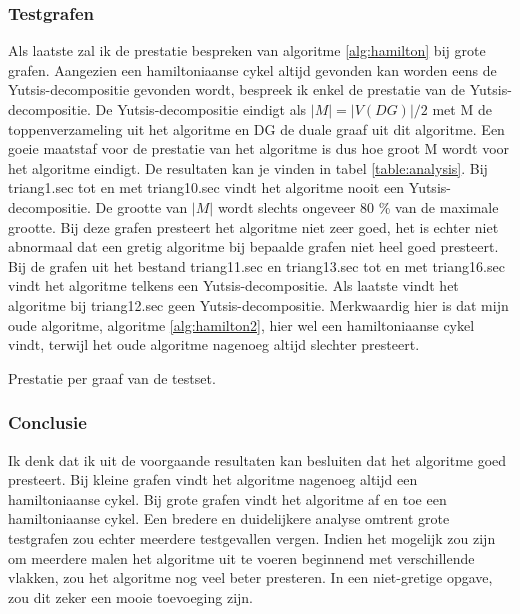 \documentclass[11pt, a4paper, table]{article}
\theoremstyle{definition}
\theoremstyle{definition}
\theoremstyle{definition}
\begin{document}
\subsubsection{Testgrafen}
Als laatste zal ik de prestatie bespreken van algoritme \ref{alg:hamilton} bij grote grafen. Aangezien een hamiltoniaanse cykel altijd gevonden kan worden eens de Yutsis-decompositie gevonden wordt, bespreek ik enkel de prestatie van de Yutsis-decompositie. De Yutsis-decompositie eindigt als $|M| = |V(DG)|/2$ met M de toppenverzameling uit het algoritme en DG de duale graaf uit dit algoritme. Een goeie maatstaf voor de prestatie van het algoritme is dus hoe groot M wordt voor het algoritme eindigt. De resultaten kan je vinden in tabel \ref{table:analysis}. Bij triang1.sec tot en met triang10.sec vindt het algoritme nooit een Yutsis-decompositie. De grootte van $|M|$ wordt slechts ongeveer 80 \% van de maximale grootte. Bij deze grafen presteert het algoritme niet zeer goed, het is echter niet abnormaal dat een gretig algoritme bij bepaalde grafen niet heel goed presteert. Bij de grafen uit het bestand triang11.sec en triang13.sec tot en met triang16.sec vindt het algoritme telkens een Yutsis-decompositie. Als laatste vindt het algoritme bij triang12.sec geen Yutsis-decompositie. Merkwaardig hier is dat mijn oude algoritme, algoritme \ref{alg:hamilton2}, hier wel een hamiltoniaanse cykel vindt, terwijl het oude algoritme nagenoeg altijd slechter presteert. 
\begin{table}
	\center
	\caption{Prestatie per graaf van de testset.}
	\label{table:analysis}
\end{table}

\subsubsection{Conclusie}
Ik denk dat ik uit de voorgaande resultaten kan besluiten dat het algoritme goed presteert. Bij kleine grafen vindt het algoritme nagenoeg altijd een hamiltoniaanse cykel. Bij grote grafen vindt het algoritme af en toe een hamiltoniaanse cykel. Een bredere en duidelijkere analyse omtrent grote testgrafen zou echter meerdere testgevallen vergen. Indien het mogelijk zou zijn om meerdere malen het algoritme uit te voeren beginnend met verschillende vlakken, zou het algoritme nog veel beter presteren. In een niet-gretige opgave, zou dit zeker een mooie toevoeging zijn. 
\end{document}
